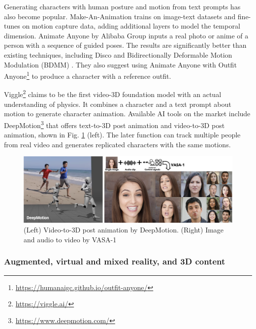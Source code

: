 \documentclass[11pt,a4paper]{article}
\begin{document}
Generating characters with human posture and motion from text prompts has also become popular. Make-An-Animation \cite{Azadi:Make:2023} trains on image-text datasets and fine-tunes on motion capture data, adding additional layers to model the temporal dimension. Animate Anyone by Alibaba Group \cite{Hu_2024_CVPR} inputs a real photo or anime of a person with a sequence of guided poses. The results are significantly better than existing techniques, including Disco \cite{wang:disco:2024} and Bidirectionally Deformable Motion Modulation (BDMM) \cite{Yu:Bidirectionally:2023}. They also suggest using Animate Anyone  with Outfit Anyone\footnote{\url{https://humanaigc.github.io/outfit-anyone/}} to produce a character with a reference outfit.

Viggle\footnote{\url{https://viggle.ai/}} claims to be the first video-3D foundation model with an actual understanding of physics. It combines a character and a text prompt about motion to generate character animation. Available AI tools on the market include DeepMotion\footnote{\url{https://www.deepmotion.com/}} that offers text-to-3D post animation and video-to-3D post animation, shown in Fig. \ref{fig:Deepmotion_Vasa} (left). The later function can track multiple people from real video and generates replicated characters with the same motions.

\begin{figure}
    \centering
    \includegraphics[width=\textwidth]{figures/Deepmotion_Vasa.png}
    \caption{(Left) Video-to-3D post animation by DeepMotion. (Right) Image and audio to video by VASA-1 \cite{xu:VASA-1:2024}}
    \label{fig:Deepmotion_Vasa}
\end{figure}

\subsubsection{Augmented, virtual and mixed reality, and 3D content}
\end{document}

